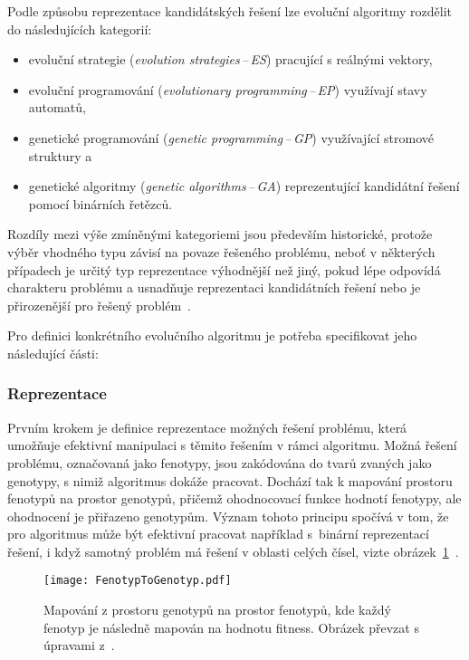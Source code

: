 Podle způsobu reprezentace kandidátských řešení lze evoluční algoritmy rozdělit do následujících kategorií:
\begin{itemize}
    \item evoluční strategie (\emph{evolution strategies\,--\,ES}) pracující s reálnými vektory,
    \item evoluční programování (\emph{evolutionary programming\,--\,EP}) využívají stavy automatů,
    \item genetické programování (\emph{genetic programming\,--\,GP}) využívající stromové struktury a
    \item genetické algoritmy (\emph{genetic algorithms\,--\,GA}) reprezentující kandidátní řešení pomocí binárních řetězců. 
\end{itemize}
Rozdíly mezi výše zmíněnými kategoriemi jsou především historické, protože výběr vhodného typu závisí na povaze řešeného problému, neboť v některých případech je určitý typ reprezentace výhodnější než jiný, pokud lépe odpovídá charakteru problému a usnadňuje reprezentaci kandidátních řešení nebo je přirozenější pro řešený problém~\cite{IntroductionToEvoComputing}. 

Pro definici konkrétního evolučního algoritmu je potřeba specifikovat jeho následující části:

\subsubsection*{Reprezentace}
Prvním krokem je definice reprezentace možných řešení problému, která umožňuje efektivní manipulaci s těmito řešením v rámci algoritmu. 
Možná řešení problému, označovaná jako fenotypy, jsou zakódována do tvarů zvaných jako genotypy, s nimiž algoritmus dokáže pracovat. 
Dochází tak k mapování prostoru fenotypů na prostor genotypů, přičemž ohodnocovací funkce hodnotí fenotypy, ale ohodnocení je přiřazeno genotypům. 
Význam tohoto principu spočívá v tom, že pro algoritmus může být efektivní pracovat například s~binární reprezentací řešení, i když samotný problém má řešení v oblasti celých čísel, vizte obrázek~\ref{fig:fenotyp-to-genotyp}~\cite{IntroductionToEvoComputing,NaturalComputing}. 
\begin{figure}[ht!]
    \centering
    \texttt{[image: FenotypToGenotyp.pdf]}
    \caption{Mapování z prostoru genotypů na prostor fenotypů, kde každý fenotyp je následně mapován na hodnotu fitness. Obrázek převzat s úpravami z~\cite{NaturalComputing}.}
    \label{fig:fenotyp-to-genotyp}
\end{figure}

